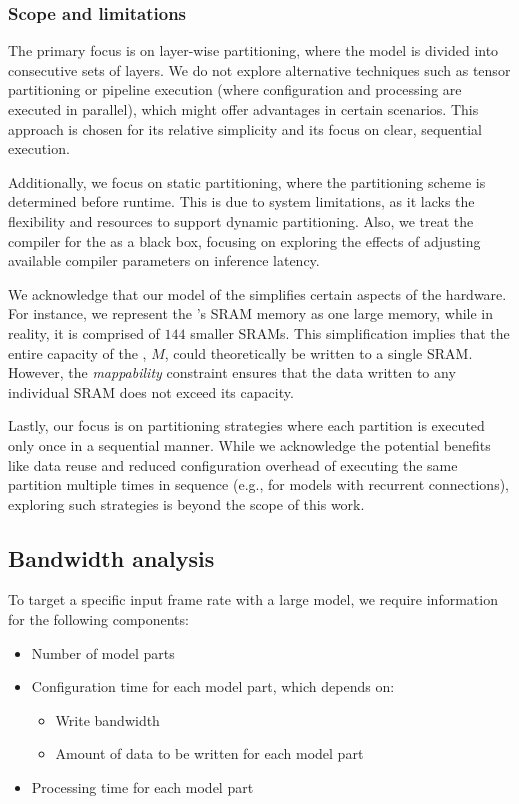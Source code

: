 \subsubsection{Scope and limitations}
The primary focus is on layer-wise partitioning, where the model is divided into consecutive sets of layers.
We do not explore alternative techniques such as tensor partitioning or pipeline execution (where configuration and processing are executed in parallel), which might offer advantages in certain scenarios.
This approach is chosen for its relative simplicity and its focus on clear, sequential execution. 

Additionally, we focus on static partitioning, where the partitioning scheme is determined before runtime.
This is due to system limitations, as it lacks the flexibility and resources to support dynamic partitioning.
Also, we treat the compiler for the \graicore{} as a black box, focusing on exploring the effects of adjusting available compiler parameters on inference latency.

We acknowledge that our model of the \graicore{} simplifies certain aspects of the hardware.
For instance, we represent the \graicore{}'s SRAM memory as one large memory, while in reality, it is comprised of $144$ smaller SRAMs.
This simplification implies that the entire capacity of the \graicore{}, $M$, could theoretically be written to a single SRAM.
However, the \textit{mappability} constraint ensures that the data written to any individual SRAM does not exceed its capacity.

Lastly, our focus is on partitioning strategies where each partition is executed only once in a sequential manner.
While we acknowledge the potential benefits like data reuse and reduced configuration overhead of executing the same partition multiple times in sequence (e.g., for models with recurrent connections), exploring such strategies is beyond the scope of this work.

\subsection{Bandwidth analysis}
To target a specific input frame rate with a large model, we require information for the following components:
\begin{itemize}
    \item Number of model parts
    \item Configuration time for each model part, which depends on:
    \begin{itemize}
        \item Write bandwidth
        \item Amount of data to be written for each model part
    \end{itemize}
    \item Processing time for each model part
\end{itemize}

